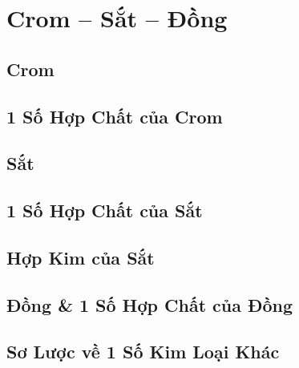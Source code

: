 \documentclass{article}
\numberwithin{equation}{section}
\begin{document}
\section{Crom -- Sắt -- Đồng}

\subsection{Crom}


\subsection{1 Số Hợp Chất của Crom}


\subsection{Sắt}


\subsection{1 Số Hợp Chất của Sắt}


\subsection{Hợp Kim của Sắt}


\subsection{Đồng \& 1 Số Hợp Chất của Đồng}


\subsection{Sơ Lược về 1 Số Kim Loại Khác}

\end{document}
